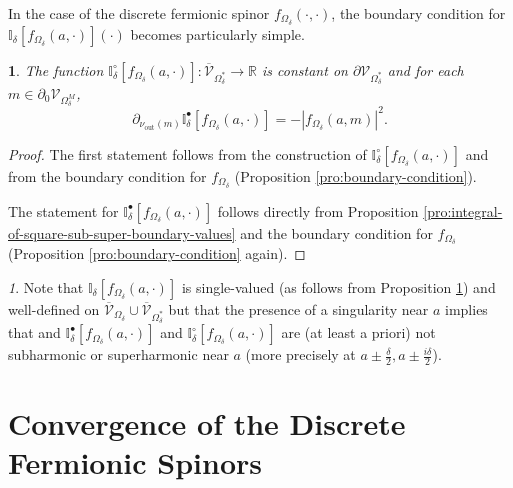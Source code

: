 \documentclass[oneside,english]{amsart}
\numberwithin{equation}{section}
\numberwithin{figure}{section}
\theoremstyle{plain}
\theoremstyle{plain}
\theoremstyle{plain}
\theoremstyle{plain}
\newtheorem{prop}[thm]{\protect\propositionname}
\theoremstyle{plain}
\theoremstyle{definition}
\theoremstyle{remark}
\newtheorem{rem}[thm]{\protect\remarkname}
\providecommand{\propositionname}{Proposition}
\providecommand{\remarkname}{Remark}
\begin{document}
In the case of the discrete fermionic spinor $f_{\Omega_{\delta}}\left(\cdot,\cdot\right)$,
the boundary condition for $\mathbb{I}_{\delta}\left[f_{\Omega_{\delta}}\left(a,\cdot\right)\right]\left(\cdot\right)$
becomes particularly simple.
\begin{prop}
\label{pro:constant-value-integral-square}The function $\mathbb{I}_{\delta}^{\circ}\left[f_{\Omega_{\delta}}\left(a,\cdot\right)\right]:\overline{\mathcal{V}}_{\Omega_{\delta}^{*}}\to\mathbb{R}$
is constant on $\partial\mathcal{V}_{\Omega_{\delta}^{*}}$ and for
each $m\in\partial_{0}\mathcal{V}_{\Omega_{\delta}^{M}}$, 
\[
\partial_{\nu_{\mathrm{out}}\left(m\right)}\mathbb{I}_{\delta}^{\bullet}\left[f_{\Omega_{\delta}}\left(a,\cdot\right)\right]=-\left|f_{\Omega_{\delta}}\left(a,m\right)\right|^{2}.
\]
\end{prop}
\begin{proof}
The first statement follows from the construction of $\mathbb{I}_{\delta}^{\circ}\left[f_{\Omega_{\delta}}\left(a,\cdot\right)\right]$
and from the boundary condition for $f_{\Omega_{\delta}}$ (Proposition
\ref{pro:boundary-condition}).

The statement for $\mathbb{I}_{\delta}^{\bullet}\left[f_{\Omega_{\delta}}\left(a,\cdot\right)\right]$
follows directly from Proposition \ref{pro:integral-of-square-sub-super-boundary-values}
and the boundary condition for $f_{\Omega_{\delta}}$ (Proposition
\ref{pro:boundary-condition} again).\end{proof}
\begin{rem}
Note that $\mathbb{I}_{\delta}\left[f_{\Omega_{\delta}}\left(a,\cdot\right)\right]$
is single-valued (as follows from Proposition \ref{pro:constant-value-integral-square})
and well-defined on $\overline{\mathcal{V}}_{\Omega_{\delta}}\cup\overline{\mathcal{V}}_{\Omega_{\delta}^{*}}$
but that the presence of a singularity near $a$ implies that and
$\mathbb{I}_{\delta}^{\bullet}\left[f_{\Omega_{\delta}}\left(a,\cdot\right)\right]$
and $\mathbb{I}_{\delta}^{\circ}\left[f_{\Omega_{\delta}}\left(a,\cdot\right)\right]$
are (at least a priori) not subharmonic or superharmonic near $a$
(more precisely at $a\pm\frac{\delta}{2},a\pm\frac{i\delta}{2}$). 
\end{rem}

\section{Convergence of the Discrete Fermionic Spinors}
\end{document}

